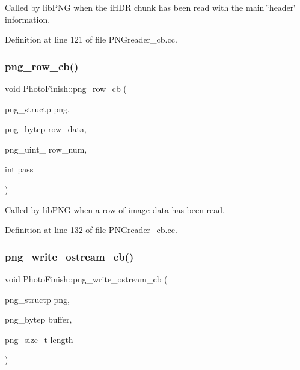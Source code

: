 Called by lib\+P\+NG when the i\+H\+DR chunk has been read with the main \char`\"{}header\char`\"{} information. 



Definition at line 121 of file P\+N\+Greader\+\_\+cb.\+cc.

\mbox{\label{namespace_photo_finish_a406711757cc8db01c66461573c1154f0}} 
\subsubsection{\texorpdfstring{png\+\_\+row\+\_\+cb()}{png\_row\_cb()}}
{\footnotesize\ttfamily void Photo\+Finish\+::png\+\_\+row\+\_\+cb (\begin{DoxyParamCaption}\item[{png\+\_\+structp}]{png,  }\item[{png\+\_\+bytep}]{row\+\_\+data,  }\item[{png\+\_\+uint\+\_\+32}]{row\+\_\+num,  }\item[{int}]{pass }\end{DoxyParamCaption})}



Called by lib\+P\+NG when a row of image data has been read. 



Definition at line 132 of file P\+N\+Greader\+\_\+cb.\+cc.

\mbox{\label{namespace_photo_finish_a13f6602af999f016ea86b08858d9c704}} 
\subsubsection{\texorpdfstring{png\+\_\+write\+\_\+ostream\+\_\+cb()}{png\_write\_ostream\_cb()}}
{\footnotesize\ttfamily void Photo\+Finish\+::png\+\_\+write\+\_\+ostream\+\_\+cb (\begin{DoxyParamCaption}\item[{png\+\_\+structp}]{png,  }\item[{png\+\_\+bytep}]{buffer,  }\item[{png\+\_\+size\+\_\+t}]{length }\end{DoxyParamCaption})}



